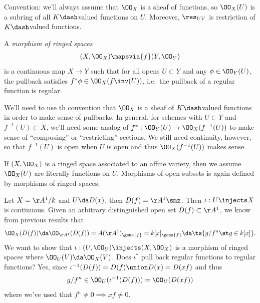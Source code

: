 Convention: we'll always assume that \(\OO_X\) is a sheaf of functions,
so \(\OO_X(U)\) is a subring of all \(K\dash\)valued functions on \(U\).
Moreover, \(\res_{UV}\) is restriction of \(K\dash\)valued functions.

\begin{definition}[Morphisms]

A \emph{morphism of ringed spaces}
\begin{align*}  
(X, \OO_X) \mapsvia{f}  (Y, \OO_Y)
\end{align*} is a continuous map \(X\to Y\) such that for all opens
\(U \subset Y\) and any \(\phi \in \OO_Y(U)\), the pullback satisfies
\(f^* \phi \in \OO_X(f\inv(U))\), i.e.~the pullback of a regular
function is regular.

\end{definition}

\begin{remark}

We'll need to use th convention that \(\OO_X\) is a sheaf of
\(K\dash\)valued functions in order to make sense of pullbacks. In
general, for schemes with \(U \subset Y\) and \(f^{-1} (U) \subset X\),
we'll need some analog of \(f^*: \OO_Y(U) \to \OO_X(f^{-1} (U) )\) to
make sense of ``composing'' or ``restricting'' sections. We still need
continuity, however, so that \(f^{-1}(U)\) is open when \(U\) is open
and thus \(\OO_X(f^{-1}(U))\) makes sense.

\end{remark}

\begin{example}

If \((X, \OO_X)\) is a ringed space associated to an affine variety,
then we assume \(\OO_X(U)\) are literally functions on \(U\). Morphisms
of open subsets is again defined by morphisms of ringed spaces.

\end{example}

\begin{example}

Let \(X = \AA^1/k\) and \(U \da D(x)\), then \(D(f) = \AA^1\smz\). Then
\(\iota: U\injects X\) is continuous. Given an arbitrary distinguished
open set \(D(f) \subset \AA^1\), we know from previous results that
\begin{align*}  
\OO_X(D(f)) \da \OO_{\AA^1}(D(f)) = A(\AA^1)_{\gens{f}} = k[x]_{\gens{f}} \da \ts{g/f^n \st g\in k[x]}
.\end{align*} We want to show that
\(\iota: (U, \OO_U) \injects (X, \OO_X)\) is a morphism of ringed spaces
where \(\OO_U(V) \da \OO_X(V)\). Does \(\iota^*\) pull back regular
functions to regular functions? Yes, since
\(\iota^{-1} (D(f)) = D(f) \union D(x) = D(xf)\) and thus
\begin{align*}
g/f^n \in \OO_U(\iota^{-1}(D(f))) = \OO_U(D(xf))
\end{align*} where we've used that \(f^n \neq 0 \implies xf\neq 0\).

\end{example}

